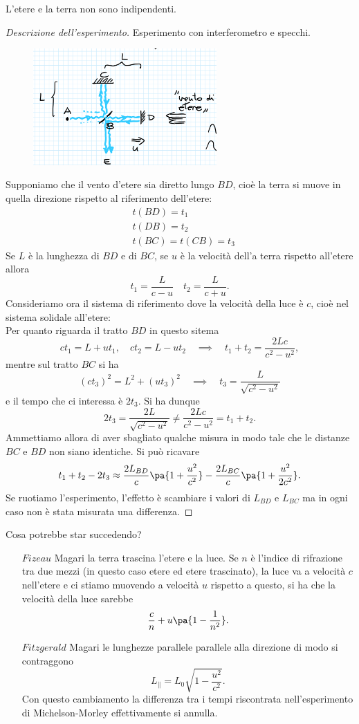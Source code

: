 \begin{fact}
L'etere e la terra non sono indipendenti.
\end{fact}
\begin{proof}[Descrizione dell'esperimento]
Esperimento con interferometro e specchi.
\begin{figure}[!htb]
    \centering
    \includegraphics[width=7cm]{images/Vento_di_Etere.png}
\end{figure}
Supponiamo che il vento d'etere sia diretto lungo $BD$, cio\`e la terra si muove in quella direzione rispetto al riferimento dell'etere:
\begin{align*}
&t(BD)=t_1\\
&t(DB)=t_2\\
&t(BC)=t(CB)=t_3
\end{align*}
Se $L$ \`e la lunghezza di $BD$ e di $BC$, se $u$ \`e la velocit\`a dell'a terra rispetto all'etere allora
\[t_1=\frac L{c-u}\quad t_2=\frac L{c+u}.\]
Consideriamo ora il sistema di riferimento dove la velocit\`a della luce \`e $c$, cio\`e nel sistema solidale all'etere:\\
Per quanto riguarda il tratto $BD$ in questo sitema 
\[ct_1=L+ut_1,\quad ct_2=L-ut_2\quad\implies\quad t_1+t_2=\frac{2Lc}{c^2-u^2},\]
mentre sul tratto $BC$ si ha
\[(ct_3)^2=L^2+(ut_3)^2\quad\implies\quad t_3=\frac L{\sqrt{c^2-u^2}}\]
e il tempo che ci interessa \`e $2t_3$. Si ha dunque
\[2t_3=\frac{2L}{\sqrt{c^2-u^2}}\neq \frac{2Lc}{c^2-u^2}=t_1+t_2.\]
Ammettiamo allora di aver sbagliato qualche misura in modo tale che le distanze $BC$ e $BD$ non siano identiche. Si pu\`o ricavare
\[t_1+t_2-2t_3\approx \frac{2L_{BD}}c\pa{1+\frac{u^2}{c^2}}-\frac{2L_{BC}}c\pa{1+\frac{u^2}{2c^2}}.\]
Se ruotiamo l'esperimento, l'effetto \`e scambiare i valori di $L_{BD}$ e $L_{BC}$ ma in ogni caso non \`e stata misurata una differenza.
\end{proof}
\noindent
Cosa potrebbe star succedendo?
\setlength{\leftmargini}{0cm}
\begin{enumerate}
\item[$\boxed{Fizeau}$] Magari la terra trascina l'etere e la luce. Se $n$ \`e l'indice di rifrazione tra due mezzi (in questo caso etere ed etere trascinato), la luce va a velocit\`a $c$ nell'etere e ci stiamo muovendo a velocit\`a $u$ rispetto a questo, si ha che la velocit\`a della luce sarebbe
\[\frac cn+u\pa{1-\frac1{n^2}}.\]
\item[$\boxed{Fitzgerald}$] Magari le lunghezze parallele parallele alla direzione di modo si contraggono
\[L_{\parallel}=L_0\sqrt{1-\frac{u^2}{c^2}}.\]
Con questo cambiamento la differenza tra i tempi riscontrata nell'esperimento di Michelson-Morley effettivamente si annulla. 
\end{enumerate}
